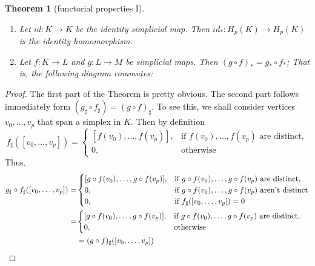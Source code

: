 \documentclass[toc=bib, headinclude]{scrartcl}
\theoremstyle{plain}
\newtheorem{theorem}{Theorem}[section]
\theoremstyle{definition}
\theoremstyle{remark}
\begin{document}
\begin{theorem}[functorial properties I]\label{func-prop1}\mbox{}
	\begin{enumerate}
		\item Let $id: K\to K$ be the identity simplicial map. Then $id_\ast: H_p(K)\to H_p(K)$ is the identity homomorphism.
		\item Let $f:K\to L$ and $g: L\to M$ be simplicial maps. Then $(g\circ f)_\ast=g_\ast\circ f_\ast$; That is, the following diagram commutes:
		
		\begin{center}
			
	\end{center}
	\end{enumerate}
\end{theorem}



\begin{proof}
	The first part of the Theorem is pretty obvious. The second part follows immediately form $(g_\sharp\circ f_\sharp)=(g\circ f)_\sharp$. To see this, we shall consider vertices $v_0,\dots,v_p$ that span a simplex in $K$.
	Then by definition 
	\[
	f_\sharp([v_0,\dots,v_p])=\begin{cases}
	[f(v_0),\dots,f(v_p)],& \text{if }f(v_0),\dots,f(v_p) \text{ are distinct},\\
	0,& \text{otherwise}
	\end{cases}
	\]
	Thus,
	\begin{align*}
	g_\sharp\circ f_\sharp([v_0,\dots,v_p])=&\begin{cases}
	[g\circ f(v_0),\dots,g\circ f(v_p)],& \text{if }g\circ f(v_0),\dots,g\circ f(v_p) \text{ are distinct},\\
	0,& \text{if }g\circ f(v_0),\dots,g\circ f(v_p) \text{ aren't distinct}\\
	0,& \text{if }f_\sharp([v_0,\dots,v_p])=0
	\end{cases}\\
	=&\begin{cases}
	[g\circ f(v_0),\dots,g\circ f(v_p)],& \text{if }g\circ f(v_0),\dots,g\circ f(v_p) \text{ are distinct},\\
		0,& \text{otherwise}
	\end{cases}\\
	&=(g\circ f)_\sharp([v_0,\dots,v_p])\qedhere
	\end{align*}
\end{proof}
\end{document}
